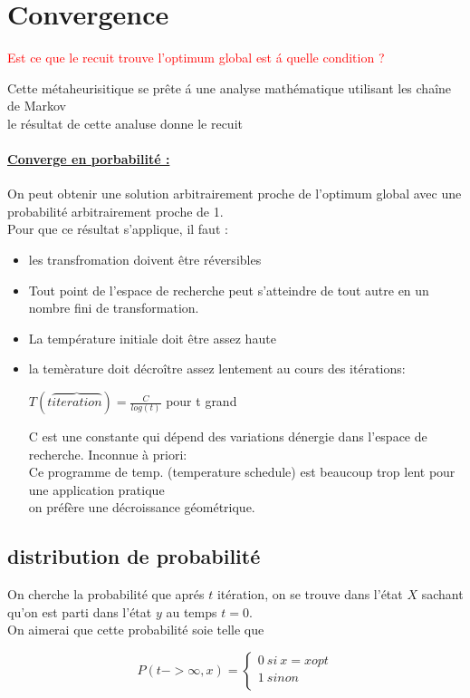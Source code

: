 \section{Convergence}

\textcolor{red}{Est ce que le recuit trouve l'optimum global  est \'a quelle condition ?}

Cette m\'etaheurisitique se pr\^ete \'a une analyse math\'ematique utilisant les cha\^ine de Markov\\ le r\'esultat de cette analuse donne le recuit 
\paragraph{\underline{Converge en porbabilit\'e :}} On peut obtenir une solution arbitrairement proche de l'optimum global avec une probabilit\'e arbitrairement proche de 1.\\ Pour que ce r\'esultat s'applique, il faut :
\begin{itemize}
\item les transfromation doivent \^etre r\'eversibles
\item Tout point de l'espace de recherche peut s'atteindre de tout autre en un nombre fini de transformation.
\item La temp\'erature initiale doit \^etre assez haute 
\item la tem\`erature doit d\'ecro\^itre assez lentement au cours des it\'erations:

\begin{center}
$T(t {\overbrace{iteration}}) =  \frac{C}{ log(t)}$ pour t grand \\

\end{center}
C est une constante qui d\'epend des variations d\'energie dans l'espace de recherche. Inconnue \`a priori:\\
Ce programme de temp. (temperature schedule)
est beaucoup trop lent pour une application pratique \\on pr\'ef\`ere une d\'ecroissance g\'eom\'etrique.
	
\end{itemize}

\subsection*{distribution de probabilit\'e }
On cherche la probabilit\'e que apr\'es $t$ it\'eration, on se trouve dans l'\'etat $X$ sachant qu'on est parti dans l'\'etat $y$ au temps $t=0$.\\
On aimerai que cette probabilit\'e soie telle que 
\begin{center}
\[ P(t->\infty,x)= \left\{
                \begin{array}{ll}
                  0 \ si\ x = xopt\\
                  1 \ sinon\\
                  
                \end{array}
              \right.
  \]
\end{center}

